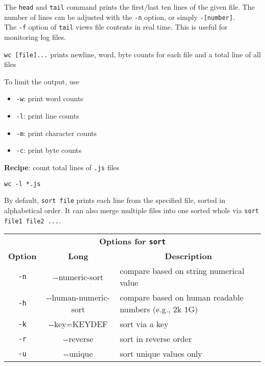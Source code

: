 \documentclass[landscape,a0paper,fontscale=0.285]{baposter} %
\newcommand{\compresslist}{ %
\setlength{\itemsep}{1pt}
\setlength{\parskip}{0pt}
\setlength{\parsep}{0pt}
}
\begin{document}
\begin{poster}
{

The \texttt{head} and \texttt{tail} command prints the first/last ten lines of the given file. The number of lines can be adjusted with the \texttt{-n} option, or simply \texttt{-[number]}.\\

The \texttt{-f} option of \texttt{tail} views file contents in real time. This is useful for monitoring log files.



\texttt{wc [file]...} prints newline, word, byte counts for each file and a total line of all files

To limit the output, use
\begin{itemize}\compresslist
    \item \texttt{-w}: print word counts
    \item \texttt{-l}: print line counts
    \item \texttt{-m}: print character counts
    \item \texttt{-c}: print byte counts
\end{itemize}


\textbf{Recipe}: count total lines of \texttt{.js} files

\begin{center}
\texttt{wc -l *.js}
\end{center}


By default, \texttt{\small{sort file}} prints each line from the specified file, sorted in alphabetical order. It can also merge multiple files into one sorted whole via \texttt{\small{sort file1 file2 ...}}. \\



\begin{tabular}{ccl}
\multicolumn{3}{c}{\textbf{Options for \texttt{sort} }} \\
\multicolumn{1}{c}{\textbf{Option}} & \multicolumn{1}{c}{\textbf{Long}}   &
\multicolumn{1}{c}{\textbf{Description}} \\
\texttt{-n} & -{}-numeric-sort & compare based on string numerical value \\
\texttt{-h} & -{}-human-numeric-sort & compare based on human readable numbers (e.g., 2k 1G) \\
\texttt{-k} & \small{-{}-key=KEYDEF} & sort via a key \\
\texttt{-r} & -{}-reverse & sort in reverse order \\
\texttt{-u} & -{}-unique & sort unique values only
\end{tabular}
\\


}
\end{poster}
\end{document}
